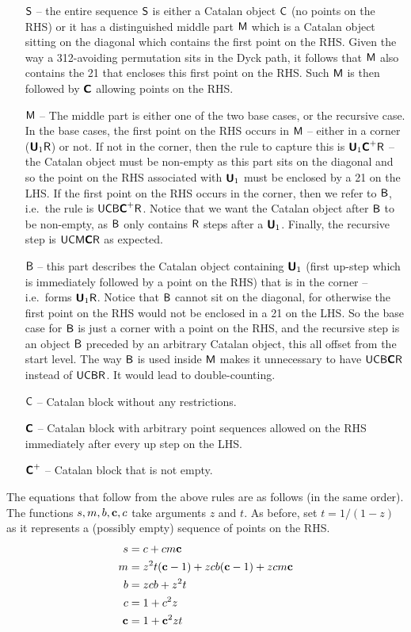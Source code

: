 \documentclass[12pt, a4paper, twoside]{report}
\begin{document}
\begin{enumerate}
\item[$\mathsf{S}$ --] the entire sequence $\mathsf{S}$ is either a Catalan object $\mathsf{C}$ (no points on the RHS) or it has a distinguished middle part $\mathsf{M}$ which is a Catalan object sitting on the diagonal which contains the first point on the RHS. Given the way a 312-avoiding permutation sits in the Dyck path, it follows that $\mathsf{M}$ also contains the 21 that encloses this first point on the RHS. Such $\mathsf{M}$ is then followed by $\textbf{\textsf{C}}$ allowing points on the RHS.
\item[$\mathsf{M}$ --] The middle part is either one of the two base cases, or the recursive case. In the base cases, the first point on the RHS occurs in $\mathsf{M}$ -- either in a corner ($\textbf{\textsf{U}}_1\mathsf{R}$) or not. If not in the corner, then the rule to capture this is $\textbf{\textsf{U}}_1\textbf{\textsf{C}}^+\mathsf{R}$ -- the Catalan object must be non-empty as this part sits on the diagonal and so the point on the RHS associated with $\textbf{\textsf{U}}_1$ must be enclosed by a 21 on the LHS. If the first point on the RHS occurs in the corner, then we refer to $\mathsf{B}$, i.e.~the rule is $\mathsf{U}\mathsf{C}\mathsf{B}\textbf{\textsf{C}}^+\mathsf{R}$. Notice that we want the Catalan object after $\mathsf{B}$ to be non-empty, as $\mathsf{B}$ only contains $\mathsf{R}$ steps after a $\textbf{\textsf{U}}_1$. Finally, the recursive step is $\mathsf{U}\mathsf{C}\mathsf{M}\textbf{\textsf{C}}\mathsf{R}$ as expected.
\item[$\mathsf{B}$ --] this part describes the Catalan object containing $\textbf{\textsf{U}}_1$ (first up-step which is immediately followed by a point on the RHS) that is in the corner -- i.e.~forms $\textbf{\textsf{U}}_1\mathsf{R}$. Notice that $\mathsf{B}$ cannot sit on the diagonal, for otherwise the first point on the RHS would not be enclosed in a 21 on the LHS. So the base case for $\mathsf{B}$ is just a corner with a point on the RHS, and the recursive step is an object $\mathsf{B}$ preceded by an arbitrary Catalan object, this all offset from the start level. The way $\mathsf{B}$ is used inside $\mathsf{M}$ makes it unnecessary to have $\mathsf{U}\mathsf{C}\mathsf{B}\textbf{\textsf{C}}\mathsf{R}$ instead of $\mathsf{U}\mathsf{C}\mathsf{B}\mathsf{R}$. It would lead to double-counting.
\item[$\mathsf{C}$ --] Catalan block without any restrictions.
\item[$\textbf{\textsf{C}}$ --] Catalan block with arbitrary point sequences allowed on the RHS immediately after every up step on the LHS. 
\item[$\textbf{\textsf{C}}^+$ --] Catalan block that is not empty.
\end{enumerate} 

\noindent The equations that follow from the above rules are as follows (in the same order). The functions $s, m, b, \mathbf{c}, c$ take arguments $z$ and $t$. As before, set $t = 1/(1-z)$ as it represents a (possibly empty) sequence of points on the RHS.
\begin{align*}
s &= c + cm\mathbf{c}\\
m &= z^2t(\mathbf{c} -1) + zcb(\mathbf{c} -1) + zcm\mathbf{c}\\
b &= zcb + z^2t\\
c &= 1 + c^2z\\
\mathbf{c} &= 1 + \mathbf{c}^2zt
\end{align*}
\end{document}

